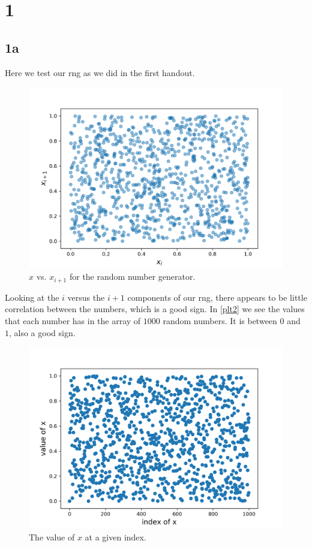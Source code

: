 \section{1}
\subsection{1a}

Here we test our rng as we did in the first handout. 
\begin{figure}[h!]
    \centering
    \includegraphics[width=0.9\linewidth]{./plots/x_x_1.png}
    \caption{$x$ vs. $x_{i+1}$ for the random number generator.}
    \label{plt1}
\end{figure}
Looking at the $i$ versus the $i+1$ components of our rng, there appears
to be little correlation between the numbers, which is a good sign. In
\autoref{plt2} we see the values that each number has in the array of 
$1000$ random numbers. It is between $0$ and $1$, also a good sign.
\begin{figure}[h!]
    \centering
    \includegraphics[width=0.9\linewidth]{./plots/xval_xind.png}
    \caption{The value of $x$ at a given index.}
    \label{plt2}
\end{figure}
